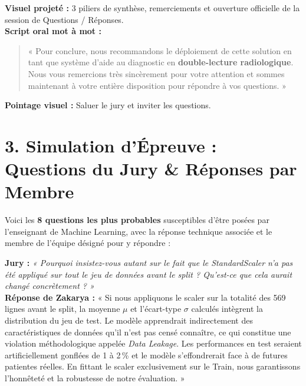 \documentclass[a4paper,11pt]{article}
\begin{document}
\begin{tcolorbox}[speechbox, title={Slide 11 : Recommandations, Conclusion Générale \& Session Q\&A (08:45 -- 09:00+)}]
	\textbf{Visuel projeté :} 3 piliers de synthèse, remerciements et ouverture officielle de la session de Questions / Réponses.\\
	\textbf{Script oral mot à mot :}
	\begin{quote}
		« Pour conclure, nous recommandons le déploiement de cette solution en tant que système d'aide au diagnostic en \textbf{double-lecture radiologique}.\\
		Nous vous remercions très sincèrement pour votre attention et sommes maintenant à votre entière disposition pour répondre à vos questions. »
	\end{quote}
	\textbf{Pointage visuel :} Saluer le jury et inviter les questions.
\end{tcolorbox}

\newpage

\section*{\color{primarygreen}3. Simulation d'Épreuve : Questions du Jury \& Réponses par Membre}

Voici les \textbf{8 questions les plus probables} susceptibles d'être posées par l'enseignant de Machine Learning, avec la réponse technique associée et le membre de l'équipe désigné pour y répondre :

\begin{tcolorbox}[qabox, title={\textbf{Question 1 (Protocole \& Fuite de données) -- Assignée à Zakarya KAIROUCH}}]
	\textbf{Jury :} \textit{« Pourquoi insistez-vous autant sur le fait que le StandardScaler n'a pas été appliqué sur tout le jeu de données avant le split ? Qu'est-ce que cela aurait changé concrètement ? »}\\
	\textbf{Réponse de Zakarya :}
	« Si nous appliquons le scaler sur la totalité des 569 lignes avant le split, la moyenne $\mu$ et l'écart-type $\sigma$ calculés intègrent la distribution du jeu de test. Le modèle apprendrait indirectement des caractéristiques de données qu'il n'est pas censé connaître, ce qui constitue une violation méthodologique appelée \textit{Data Leakage}. Les performances en test seraient artificiellement gonflées de 1 à 2\,\% et le modèle s'effondrerait face à de futures patientes réelles. En fittant le scaler exclusivement sur le Train, nous garantissons l'honnêteté et la robustesse de notre évaluation. »
\end{tcolorbox}
\end{document}

